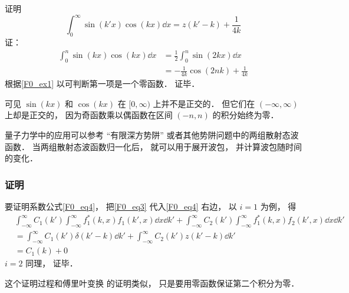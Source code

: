 \begin{example}{}
证明
\begin{equation}
\int_0^\infty \sin(k'x)\cos(kx) \dd{x} = z(k' - k) + \frac{1}{4k}
\end{equation}
证：
\begin{equation}
\begin{aligned}
\int_0^n \sin(kx)\cos(kx) \dd{x} &= \frac{1}{2} \int_0^n \sin(2kx) \dd{x}\\
&= -\frac{1}{4k}\cos(2nk) + \frac{1}{4k}
\end{aligned}
\end{equation}
根据\autoref{F0_ex1} 以可判断第一项是一个零函数． 证毕．

可见 $\sin(kx)$ 和 $\cos(kx)$ 在 $[0,\infty)$ 上并不是正交的． 但它们在 $(-\infty, \infty)$ 上却是正交的， 因为奇函数乘以偶函数在区间 $(-n, n)$ 的积分始终为零．
\end{example}

量子力学中的应用可以参考 “有限深方势阱” 或者其他势阱问题中的两组散射态波函数． 当两组散射态波函数归一化后， 就可以用于展开波包， 并计算波包随时间的变化．

\subsubsection{证明}
要证明系数公式\autoref{F0_eq4}， 把\autoref{F0_eq3} 代入\autoref{F0_eq4} 右边， 以 $i = 1$ 为例， 得
\begin{equation}
\begin{aligned}
&\int_{-\infty}^{\infty} C_1(k') \int_{-\infty}^{\infty} f_1^*(k, x) f_1(k', x)\dd{x} \dd{k'} + \int_{-\infty}^{\infty} C_2(k') \int_{-\infty}^{\infty} f_1^*(k, x)f_2(k', x)\dd{x} \dd{k'}\\
&= \int_{-\infty}^{\infty} C_1(k') \delta(k' - k) \dd{k'} + \int_{-\infty}^{\infty} C_2(k') z(k' - k) \dd{k'}\\
&= C_1(k) + 0
\end{aligned}
\end{equation}
$i = 2$ 同理， 证毕．

这个证明过程和傅里叶变换 的证明类似， 只是要用零函数保证第二个积分为零．
